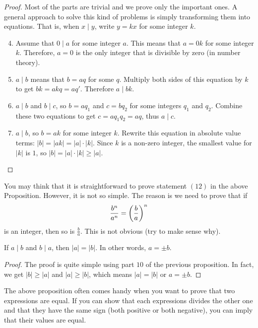 \begin{proof}
	Most of the parts are trivial and we prove only the important ones. A general approach to solve this kind of problems is simply transforming them into equations. That is, when $x\mid y$, write $y=kx$ for some integer $k$.
	\begin{enumerate}
		\setcounter{enumi}{3}
		\item Assume that $0\mid a$ for some integer $a$. This means that $a=0k$ for some integer $k$. Therefore, $a=0$ is the only integer that is divisible by zero (in number theory).
		\setcounter{enumi}{5}
		\item $a\mid b$ means that $b=aq$ for some $q$. Multiply both sides of this equation by $k$ to get $bk = akq=aq'$. Therefore $a\mid bk$.
		\setcounter{enumi}{8}
		\item $a\mid b$ and $b\mid c$, so $b=aq_1$ and $c=bq_2$ for some integers $q_1$ and $q_2$. Combine these two equations to get $c = aq_1q_2 = aq$, thus $a\mid c$.
		\setcounter{enumi}{9}
		\item $a\mid b$, so $b = ak$ for some integer $k$. Rewrite this equation in absolute value terms: $|b| = |ak| = |a| \cdot |k|$. Since $k$ is a non-zero integer, the smallest value for $|k|$ is $1$, so $|b| = |a| \cdot |k| \geq |a|$.
		\setcounter{enumi}{11}
	\end{enumerate}
\end{proof}

\begin{note}
 You may think that it is straightforward to prove statement $(12)$ in the above Proposition. However, it is not so simple. The reason is we need to prove that if $$\frac{b^n}{a^n}=\left(\frac{b}{a}\right)^n$$ is an integer, then so is $\frac{b}{a}$. This is not obvious (try to make sense why).
\end{note}

\begin{proposition}\label{prop:bothdivide}
	If $a \mid b$ and $b \mid a$, then  $|a|=|b|$. In other words, $a=\pm b$.
\end{proposition}

\begin{proof}
	The proof is quite simple using part $10$ of the previous proposition. In fact, we get $|b| \geq |a|$ and $|a| \geq |b|$, which means $|a| = |b|$ or $a = \pm b$.
\end{proof}
The above proposition often comes handy when you want to prove that two expressions are equal. If you can show that each expressions divides the other one and that they have the same sign (both positive or both negative), you can imply that their values are equal.

